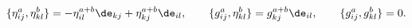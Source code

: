 \begin{equation}
\{\eta^a_{ij} , \eta^b_{kl}\}=-\eta^{a+b}_{il}\de_{kj} +
\eta^{a+b}_{kj}\de_{il},
\qquad
\{ g^a_{ij}, \eta^b_{kl}\}= g^{a+b}_{kj}\de_{il},
\qquad
\{ g^a_{ij}, g^b_{kl}\}=0.
\label{PB}
\end{equation}

